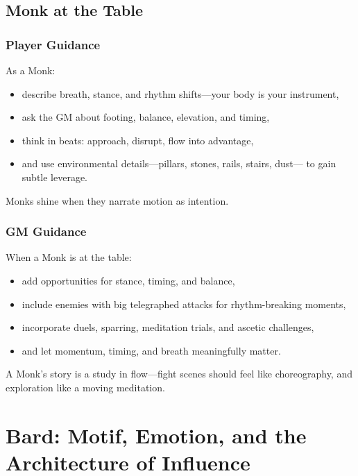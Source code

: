 \documentclass[11pt]{book}
\begin{document}
\section{Monk at the Table}

\subsection{Player Guidance}

As a Monk:
\begin{itemize}
  \item describe breath, stance, and rhythm shifts---your body is your instrument,
  \item ask the GM about footing, balance, elevation, and timing,
  \item think in beats: approach, disrupt, flow into advantage,
  \item and use environmental details---pillars, stones, rails, stairs, dust---
        to gain subtle leverage.
\end{itemize}

Monks shine when they narrate motion as intention.

\subsection{GM Guidance}

When a Monk is at the table:
\begin{itemize}
  \item add opportunities for stance, timing, and balance,
  \item include enemies with big telegraphed attacks for rhythm-breaking moments,
  \item incorporate duels, sparring, meditation trials, and ascetic challenges,
  \item and let momentum, timing, and breath meaningfully matter.
\end{itemize}

A Monk's story is a study in flow---fight scenes should feel like choreography,
and exploration like a moving meditation.


\chapter{Bard: Motif, Emotion, and the Architecture of Influence}
\end{document}

